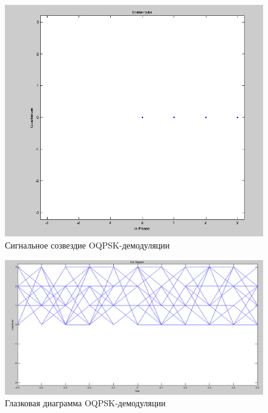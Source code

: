 \begin{figure}[H]
\includegraphics[width=150mm, scale = 0.9]{lab9/9_11}
   \caption{Сигнальное созвездие OQPSK-демодуляции}
\end{figure}



\begin{figure}[H]
\includegraphics[width=150mm, scale = 0.9]{lab9/9_12}
   \caption{Глазковая диаграмма OQPSK-демодуляции}
\end{figure}



